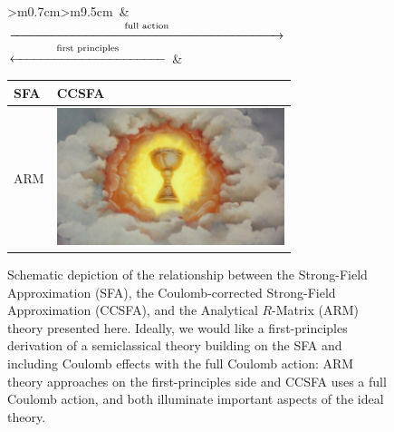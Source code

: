 \begin{figure}[htb]
\centering
\begin{tabular}{>{\centering\arraybackslash}m{0.7cm}>{\centering\arraybackslash}m{9.5cm}}
$\,$&
\Large
\hspace{-7.5mm}
$\displaystyle\stackrel{\text{full action}}{\xrightarrow{\hspace*{7.5cm}}}$
\vspace{0mm}
\\  %
\Large
{}%
{
\hspace{-5mm}
$\displaystyle\stackrel{\text{first principles}}{\xleftarrow{\hspace*{4.2cm}}}$
\hspace{0.5mm}
}
\hspace{-50mm}
& 
\hspace{-7.5mm}
\begin{tabular}{|>{\centering\arraybackslash}m{1cm}|>{\centering\arraybackslash}m{7.3cm}|}
\hline
\vspace{2.5mm}  SFA   \vspace{1.5mm}  & 
\vspace{2.5mm} CCSFA \vspace{1.5mm}  \\ \hline
ARM & 
\vspace{4mm}  \includegraphics[height=4cm]{5-Quantum-orbits/Figures/figure5A.png}  \hspace{-1mm}\vspace{3mm}
\\ \hline
\end{tabular}
\end{tabular}
\vspace{4mm}

\caption[Schematic relationship between the SFA, CCSFA and ARM theories]{
Schematic depiction of the relationship between the Strong-Field Approximation (SFA), the Coulomb-corrected Strong-Field Approximation (CCSFA), and the Analytical $R$-Matrix (ARM) theory presented here. Ideally, we would like a first-principles derivation of a semiclassical theory building on the SFA and including Coulomb effects with the full Coulomb action: ARM theory approaches on the first-principles side and CCSFA uses a full Coulomb action, and both illuminate important aspects of the ideal theory.
}
\label{f5-holy-grail-table}
\end{figure}




